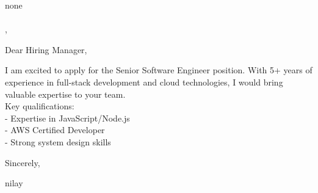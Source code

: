 \documentclass[11pt,a4paper]{letter}
\begin{document}
\begin{letter}{
none\\
\\
, 
}

\address{
nilay\\
\\
, \\
9016989674\\
\href{mailto:nilaypatel@gmail.com}{nilaypatel@gmail.com}
}

\date{April 14, 2025}

\opening{Dear Hiring Manager,}

I am excited to apply for the Senior Software Engineer position. With 5+ years of experience in full-stack development and cloud technologies, I would bring valuable expertise to your team. \\
Key qualifications: \\
- Expertise in JavaScript/Node.js \\
- AWS Certified Developer \\
- Strong system design skills



\closing{Sincerely,}

\vspace{0.5in}
nilay

\end{letter}
\end{document}
